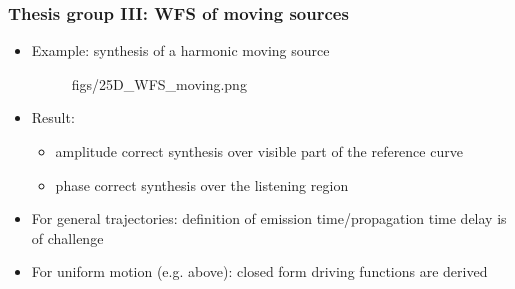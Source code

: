 \documentclass{beamer}
\begin{document}
\begin{frame}
\frametitle{Thesis group III: WFS of moving sources}
\begin{itemize}
\item Example: synthesis of a harmonic moving source
\begin{figure}  
\hspace{-10mm}
	\begin{overpic}[width = 0.95\columnwidth ]{figs/25D_WFS_moving.png}
	\end{overpic}  
\end{figure}
\item Result:
\begin{itemize}
\small
	\item amplitude correct synthesis over visible part of the reference curve
	\item phase correct synthesis over the listening region
\end{itemize}
\item For general trajectories: definition of emission time/propagation time delay is of challenge
\end{itemize}
\vspace{-1mm}
\begin{tcolorbox}
\begin{itemize}
\item For uniform motion (e.g. above): closed form driving functions are derived
\end{itemize}
\end{tcolorbox}
\end{frame}
\end{document}
